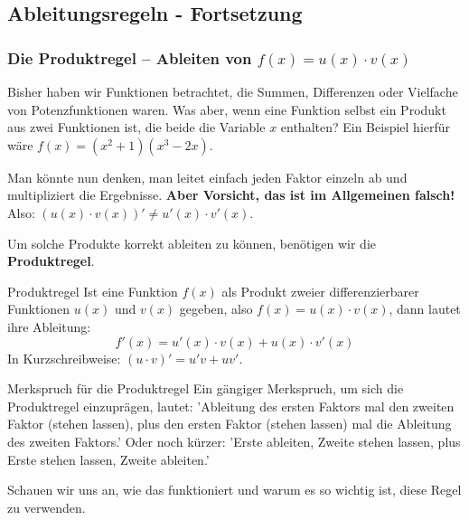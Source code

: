 \subsection{Ableitungsregeln - Fortsetzung}

\subsubsection{Die Produktregel – Ableiten von $f(x) = u(x) \cdot v(x)$}
\label{subsubsec:produktregel}

Bisher haben wir Funktionen betrachtet, die Summen, Differenzen oder Vielfache von Potenzfunktionen waren. Was aber, wenn eine Funktion selbst ein Produkt aus zwei Funktionen ist, die beide die Variable $x$ enthalten? 
Ein Beispiel hierfür wäre $f(x) = (x^2+1)(x^3-2x)$.

Man könnte nun denken, man leitet einfach jeden Faktor einzeln ab und multipliziert die Ergebnisse. \textbf{Aber Vorsicht, das ist im Allgemeinen falsch!}
Also: $(u(x) \cdot v(x))' \neq u'(x) \cdot v'(x)$.

Um solche Produkte korrekt ableiten zu können, benötigen wir die \textbf{Produktregel}.

\begin{merksatzumgebung}{Produktregel}
Ist eine Funktion $f(x)$ als Produkt zweier differenzierbarer Funktionen $u(x)$ und $v(x)$ gegeben, also $f(x) = u(x) \cdot v(x)$, dann lautet ihre Ableitung:
\[ f'(x) = u'(x) \cdot v(x) + u(x) \cdot v'(x) \]
In Kurzschreibweise: $(u \cdot v)' = u'v + uv'$.
\end{merksatzumgebung}

\begin{tippumgebung}{Merkspruch für die Produktregel}
Ein gängiger Merkspruch, um sich die Produktregel einzuprägen, lautet:
'Ableitung des ersten Faktors mal den zweiten Faktor (stehen lassen), plus den ersten Faktor (stehen lassen) mal die Ableitung des zweiten Faktors.'
Oder noch kürzer: 'Erste ableiten, Zweite stehen lassen, plus Erste stehen lassen, Zweite ableiten.'
\end{tippumgebung}

Schauen wir uns an, wie das funktioniert und warum es so wichtig ist, diese Regel zu verwenden.

